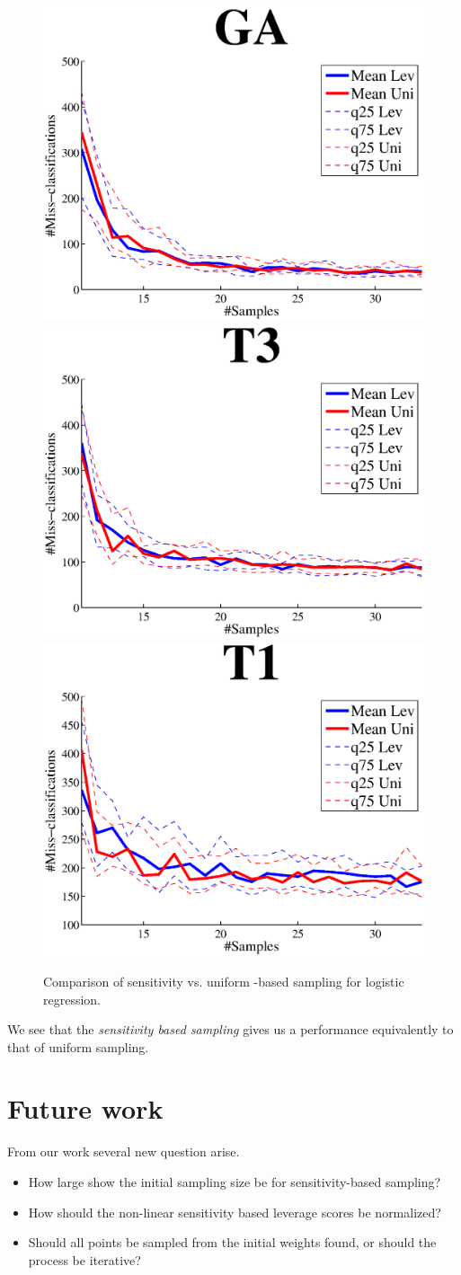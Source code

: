 \documentclass{article}
\begin{document}
\begin{figure}[t]
\centering
\includegraphics[width=.49\linewidth]{images/GAsen.eps}
\includegraphics[width=.49\linewidth]{images/T3sen.eps}
\includegraphics[width=.49\linewidth]{images/T1sen.eps}
\caption{Comparison of sensitivity vs. uniform -based sampling for logistic regression.}
\end{figure}	

We see that the \emph{sensitivity based sampling} gives us a performance  equivalently to that of uniform sampling.
%
\section{Future work}
From our work several new question arise.
\begin{itemize}
\item How large show the initial sampling size be for sensitivity-based sampling?
\item How should the non-linear sensitivity based leverage scores be normalized? 
\item Should all points be sampled from the initial weights found, or should the process be iterative?
\end{itemize}
%
\end{document}
